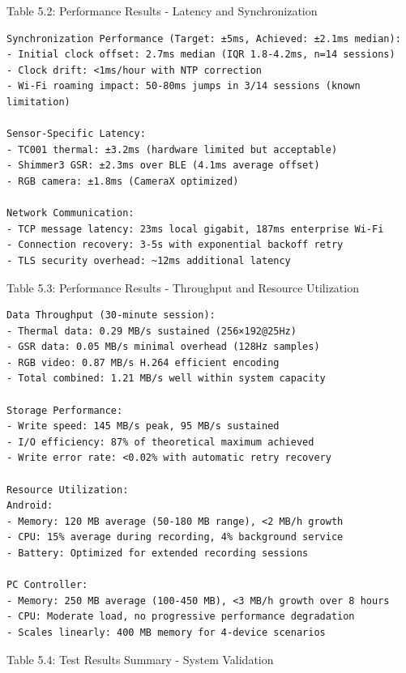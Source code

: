 Table 5.2: Performance Results - Latency and Synchronization  

\begin{verbatim}
Synchronization Performance (Target: ±5ms, Achieved: ±2.1ms median):
- Initial clock offset: 2.7ms median (IQR 1.8-4.2ms, n=14 sessions)
- Clock drift: <1ms/hour with NTP correction
- Wi-Fi roaming impact: 50-80ms jumps in 3/14 sessions (known limitation)

Sensor-Specific Latency:
- TC001 thermal: ±3.2ms (hardware limited but acceptable)
- Shimmer3 GSR: ±2.3ms over BLE (4.1ms average offset)  
- RGB camera: ±1.8ms (CameraX optimized)

Network Communication:
- TCP message latency: 23ms local gigabit, 187ms enterprise Wi-Fi
- Connection recovery: 3-5s with exponential backoff retry
- TLS security overhead: ~12ms additional latency
\end{verbatim}

Table 5.3: Performance Results - Throughput and Resource Utilization

\begin{verbatim}
Data Throughput (30-minute session):
- Thermal data: 0.29 MB/s sustained (256×192@25Hz)
- GSR data: 0.05 MB/s minimal overhead (128Hz samples)
- RGB video: 0.87 MB/s H.264 efficient encoding
- Total combined: 1.21 MB/s well within system capacity

Storage Performance:
- Write speed: 145 MB/s peak, 95 MB/s sustained
- I/O efficiency: 87% of theoretical maximum achieved
- Write error rate: <0.02% with automatic retry recovery

Resource Utilization:
Android:
- Memory: 120 MB average (50-180 MB range), <2 MB/h growth
- CPU: 15% average during recording, 4% background service
- Battery: Optimized for extended recording sessions

PC Controller:  
- Memory: 250 MB average (100-450 MB), <3 MB/h growth over 8 hours
- CPU: Moderate load, no progressive performance degradation  
- Scales linearly: 400 MB memory for 4-device scenarios
\end{verbatim}

Table 5.4: Test Results Summary - System Validation

